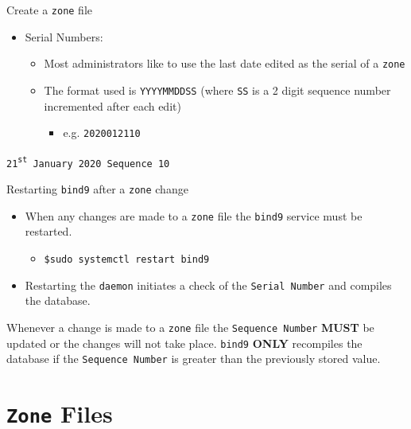 \documentclass[xcolor=table]{beamer}
\begin{document}
\begin{frame}{Create a \texttt{zone} file}
  \begin{itemize}
    \item Serial Numbers:
      \begin{itemize}
        \item Most administrators like to use the last date edited as the serial of a \texttt{zone}
        \item The format used is \texttt{YYYYMMDDSS} (where \texttt{SS} is a 2 digit sequence number incremented after each edit)
          \begin{itemize}
            \item e.g. \texttt{2020012110}
          \end{itemize}
      \end{itemize}
  \end{itemize}
  \begin{tcolorbox}
    \begin{center}
      \texttt{21\textsuperscript{st} January 2020 Sequence 10}
    \end{center}
  \end{tcolorbox}
\end{frame}

\begin{frame}{Restarting \texttt{bind9} after a \texttt{zone} change}
  \begin{itemize}
    \item When any changes are made to a \texttt{zone} file the \texttt{bind9} service must be restarted.
      \begin{itemize}
        \item \texttt{\$sudo systemctl restart bind9}
      \end{itemize}
    \item Restarting the \texttt{daemon} initiates a check of the \texttt{Serial Number} and compiles the database.
  \end{itemize}
  \begin{tcolorbox}[title={\textbf{NOTE:}}]
    Whenever a change is made to a \texttt{zone} file the \texttt{Sequence Number} \textbf{MUST} be updated or the changes will not take place. \texttt{bind9} \textbf{ONLY} recompiles the database if the \texttt{Sequence Number} is greater than the previously stored value.
  \end{tcolorbox}
\end{frame}

\section{\texttt{Zone} Files}
\end{document}
